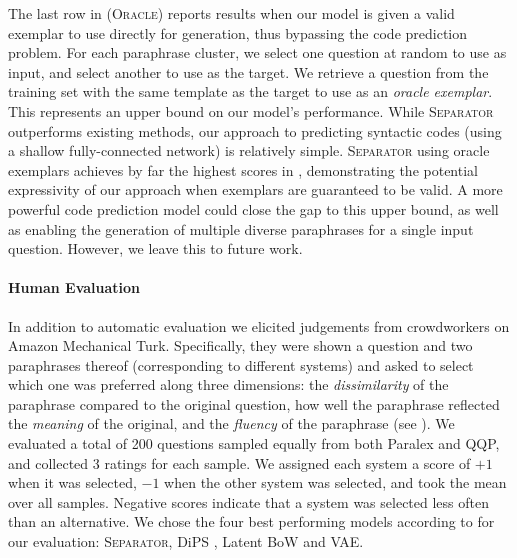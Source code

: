 \documentclass[11pt,a4paper]{article}
\begin{document}
The last row in  (\textsc{Oracle}) reports results when our model is
given a valid exemplar to use directly for generation, thus bypassing
the code prediction problem.  For each paraphrase cluster, we select
one question at random to use as input, and select another to use as
the target. We retrieve a question from the training set with the
same template as the target to use as an \textit{oracle
  exemplar}. This represents an upper bound on our model's performance.
While \textsc{Separator} outperforms existing methods, our approach to
predicting syntactic codes (using a shallow fully-connected network) is
relatively simple. \textsc{Separator} using oracle exemplars achieves
by far the highest scores in , demonstrating the
potential expressivity of our approach when exemplars are guaranteed
to be valid. A more powerful code prediction model could close the gap
to this upper bound, as well as enabling the generation of multiple
diverse paraphrases for a single input question. However, we leave
this to future work.





\paragraph{Human Evaluation}



In addition to automatic evaluation we elicited judgements from
crowdworkers on Amazon Mechanical Turk. Specifically, they were shown
a question and two paraphrases thereof (corresponding to different
systems) and asked to select which one was preferred along three
dimensions: the \textit{dissimilarity} of the paraphrase compared to
the original question, how well the paraphrase reflected the
\textit{meaning} of the original, and the \textit{fluency} of the
paraphrase (see ). We evaluated a total of 200
questions sampled equally from both Paralex and QQP, and collected 3
ratings for each sample. We assigned each system a score of $+1$ when
it was selected, $-1$ when the other system was selected, and took the
mean over all samples. Negative scores indicate that a system was
selected less often than an alternative. We chose the four best
performing models according to  for our evaluation:
\textsc{Separator}, DiPS \cite{kumar-etal-2019-submodular}, Latent BoW
\cite{latentbow} and VAE.
\end{document}
